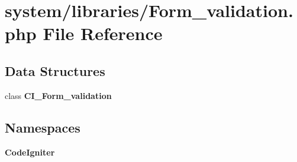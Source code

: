 \section{system/libraries/\-Form\-\_\-validation.php File Reference}
\label{_form__validation_8php}
\subsection*{Data Structures}
\begin{DoxyCompactItemize}
\item 
class {\bf C\-I\-\_\-\-Form\-\_\-validation}
\end{DoxyCompactItemize}
\subsection*{Namespaces}
\begin{DoxyCompactItemize}
\item 
{\bf Code\-Igniter}
\end{DoxyCompactItemize}
